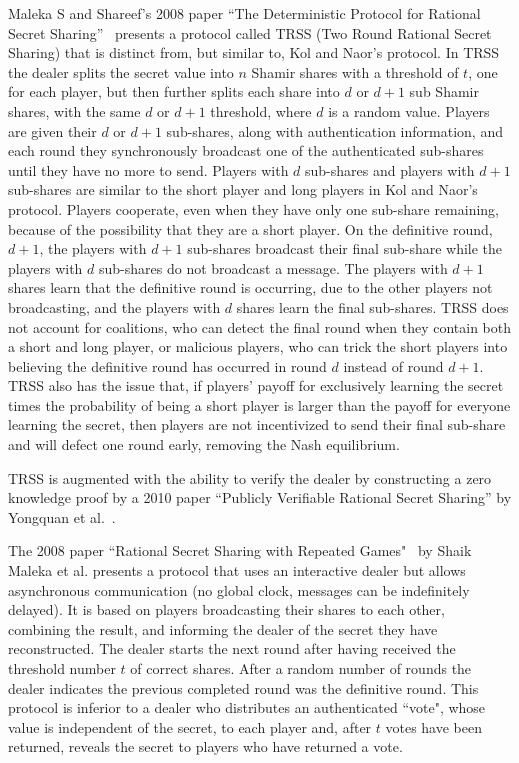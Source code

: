 \documentclass[12pt]{dalcsthesis}
\begin{document}
Maleka S and Shareef's 2008 paper ``The Deterministic Protocol for Rational Secret Sharing''~\cite{MalekaS_08} presents a protocol called TRSS (Two Round Rational Secret Sharing) that is distinct from, but similar to, Kol and Naor's protocol. In TRSS the dealer splits the secret value into $n$ Shamir shares with a threshold of $t$, one for each player, but then further splits each share into $d$ or $d+1$ sub Shamir shares, with the same $d$ or $d+1$ threshold, where $d$ is a random value. Players are given their $d$ or $d+1$ sub-shares, along with authentication information, and each round they synchronously broadcast one of the authenticated sub-shares until they have no more to send. Players with $d$ sub-shares and players with $d+1$ sub-shares are similar to the short player and long players in Kol and Naor's protocol. Players cooperate, even when they have only one sub-share remaining, because of the possibility that they are a short player. On the definitive round, $d+1$, the players with $d+1$ sub-shares broadcast their final sub-share while the players with $d$ sub-shares do not broadcast a message. The players with $d+1$ shares learn that the definitive round is occurring, due to the other players not broadcasting, and the players with $d$ shares learn the final sub-shares. TRSS does not account for coalitions, who can detect the final round when they contain both a short and long player, or malicious players, who can trick the short players into believing the definitive round has occurred in round $d$ instead of round $d+1$. TRSS also has the issue that, if players' payoff for exclusively learning the secret times the probability of being a short player is larger than the payoff for everyone learning the secret, then players are not incentivized to send their final sub-share and will defect one round early, removing the Nash equilibrium.

TRSS is augmented with the ability to verify the dealer by constructing a zero knowledge proof by a 2010 paper ``Publicly Verifiable Rational Secret Sharing'' by Yongquan et al.~\cite{yongquan10}.

The 2008 paper ``Rational Secret Sharing with Repeated Games"~\cite{maleka08} by Shaik Maleka et al. presents a protocol that uses an interactive dealer but allows asynchronous communication (no global clock, messages can be indefinitely delayed). It is based on players broadcasting their shares to each other, combining the result, and informing the dealer of the secret they have reconstructed. The dealer starts the next round after having received the threshold number $t$ of correct shares. After a random number of rounds the dealer indicates the previous completed round was the definitive round. This protocol is inferior to a dealer who distributes an authenticated ``vote", whose value is independent of the secret, to each player and, after $t$ votes have been returned, reveals the secret to players who have returned a vote. 
\end{document}
